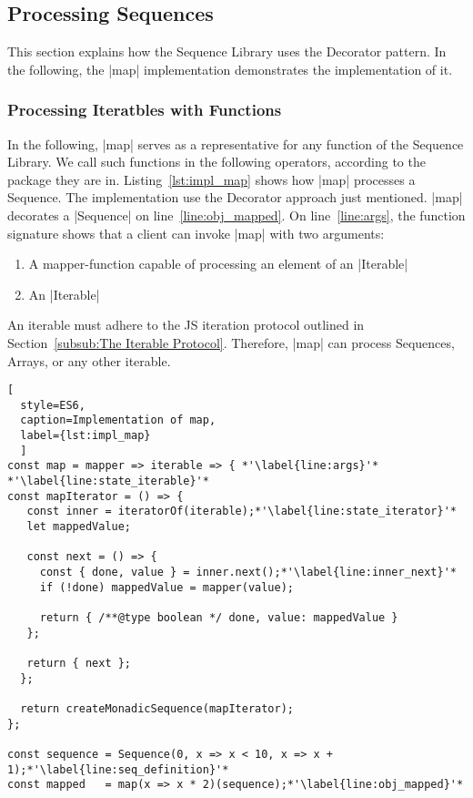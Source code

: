 \subsection{Processing Sequences}
\label{sec:Processing Sequences}
This section explains how the Sequence Library uses the Decorator pattern.
In the following, the |map| implementation demonstrates the implementation of it. 

\subsubsection{Processing Iteratbles with Functions}
\label{subsub:Processing Iterables with Functions}
In the following, |map| serves as a representative for any function of the
Sequence Library. We call such functions in the following operators,
according to the package they are in.
Listing~\ref{lst:impl_map} shows how |map| processes a Sequence. The
implementation use the Decorator approach just mentioned. |map| decorates a
|Sequence| on line~\ref{line:obj_mapped}.
\newline
On line~\ref{line:args}, the function signature shows that a client can invoke 
|map| with two arguments:

\begin{enumerate}
  \item{A mapper-function capable of processing an element of an |Iterable|}
  \item{An |Iterable|}
\end{enumerate}

An iterable must adhere to the JS iteration protocol 
outlined in Section~\ref{subsub:The Iterable Protocol}. Therefore, |map| can 
process Sequences, Arrays, or any other iterable. 

\begin{lstlisting}[
  style=ES6, 
  caption=Implementation of map,
  label={lst:impl_map}
  ]
const map = mapper => iterable => { *'\label{line:args}'*
*'\label{line:state_iterable}'*
const mapIterator = () => {
   const inner = iteratorOf(iterable);*'\label{line:state_iterator}'*
   let mappedValue;
 
   const next = () => {
     const { done, value } = inner.next();*'\label{line:inner_next}'*
     if (!done) mappedValue = mapper(value);
 
     return { /**@type boolean */ done, value: mappedValue }
   };
 
   return { next };
  };
 
  return createMonadicSequence(mapIterator);
};

const sequence = Sequence(0, x => x < 10, x => x + 1);*'\label{line:seq_definition}'*
const mapped   = map(x => x * 2)(sequence);*'\label{line:obj_mapped}'*
\end{lstlisting}

